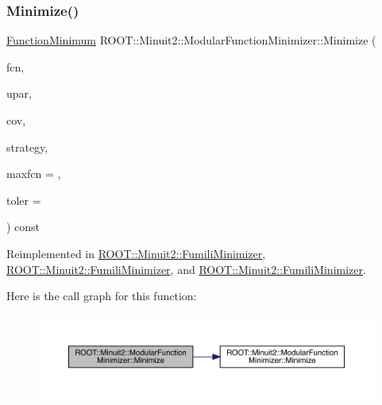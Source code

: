 \subsubsection{\texorpdfstring{Minimize()}{Minimize()}\hspace{0.1cm}{\footnotesize\ttfamily [24/33]}}
{\footnotesize\ttfamily \mbox{\hyperlink{classROOT_1_1Minuit2_1_1FunctionMinimum}{Function\+Minimum}} R\+O\+O\+T\+::\+Minuit2\+::\+Modular\+Function\+Minimizer\+::\+Minimize (\begin{DoxyParamCaption}\item[{const \mbox{\hyperlink{classROOT_1_1Minuit2_1_1FCNGradientBase}{F\+C\+N\+Gradient\+Base}} \&}]{fcn,  }\item[{const \mbox{\hyperlink{classROOT_1_1Minuit2_1_1MnUserParameters}{Mn\+User\+Parameters}} \&}]{upar,  }\item[{const \mbox{\hyperlink{classROOT_1_1Minuit2_1_1MnUserCovariance}{Mn\+User\+Covariance}} \&}]{cov,  }\item[{const \mbox{\hyperlink{classROOT_1_1Minuit2_1_1MnStrategy}{Mn\+Strategy}} \&}]{strategy,  }\item[{unsigned int}]{maxfcn = {},  }\item[{double}]{toler = {} }\end{DoxyParamCaption}) const\hspace{0.3cm}{\ttfamily [virtual]}}



Reimplemented in \mbox{\hyperlink{classROOT_1_1Minuit2_1_1FumiliMinimizer_adb2739d40e10cce1923e5a21dac3f420}{R\+O\+O\+T\+::\+Minuit2\+::\+Fumili\+Minimizer}}, \mbox{\hyperlink{classROOT_1_1Minuit2_1_1FumiliMinimizer_adb2739d40e10cce1923e5a21dac3f420}{R\+O\+O\+T\+::\+Minuit2\+::\+Fumili\+Minimizer}}, and \mbox{\hyperlink{classROOT_1_1Minuit2_1_1FumiliMinimizer_adb2739d40e10cce1923e5a21dac3f420}{R\+O\+O\+T\+::\+Minuit2\+::\+Fumili\+Minimizer}}.

Here is the call graph for this function\+:
\nopagebreak
\begin{figure}[H]
\begin{center}
\leavevmode
\includegraphics[width=350pt]{d3/dc8/classROOT_1_1Minuit2_1_1ModularFunctionMinimizer_afcfe05cabceaab80b036f5b809c6de32_cgraph}
\end{center}
\end{figure}
\mbox{\label{classROOT_1_1Minuit2_1_1ModularFunctionMinimizer_a1ae6ed90bc87c3db98388f3d26980a51}} 
